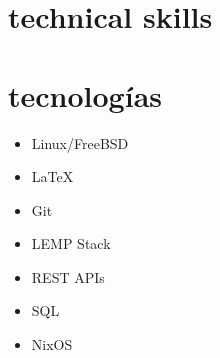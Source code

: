 \documentclass[letterpaper,11pt]{article}
\begin{document}
{\begin{minipage}[t]{0.31\textwidth}
        {\section{technical skills}}
        {\section{tecnologías}}%
    \hlight
    \begin{itemize}[]
            \item{Linux/FreeBSD}
            \item{\LaTeX}
            \item{Git}
            \item{LEMP Stack}
            \item{REST APIs}
            \item{SQL}
            \item{NixOS}
          \end{itemize}


\end{minipage}}
\end{document}
